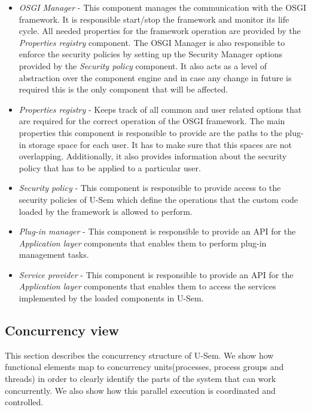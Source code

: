 \begin{itemize}

\item \textit{OSGI Manager} - This component manages the communication with the OSGI framework. It is responsible start/stop the framework and monitor its life cycle. All needed properties for the framework operation are provided by the \textit{Properties registry} component. The OSGI Manager is also responsible to enforce the security policies by setting up the Security Manager options provided by the \textit{Security policy} component. It also acts as a level of abstraction over the component engine and in case any change in future is required this is the only component that will be affected. 

\item \textit{Properties registry} - Keeps track of all common and user related options that are required for the correct operation of the OSGI framework. The main properties this component is responsible to provide are the paths to the plug-in storage space for each user. It has to make sure that this spaces are not overlapping. Additionally, it also provides information about the security policy that has to be applied to a particular user. 

\item \textit{Security policy} - This component is responsible to provide access to the security policies of U-Sem which define the operations that the custom code loaded by the framework is allowed to perform.

\item \textit{Plug-in manager} - This component is responsible to provide an API for the \textit{Application layer} components that enables them to perform plug-in management tasks.

\item \textit{Service provider} - This component is responsible to provide an API for the \textit{Application layer} components that enables them to access the services implemented by the loaded components in U-Sem.

\end{itemize}

\subsection{Concurrency view}

This section describes the concurrency structure of U-Sem. We show how functional elements map to concurrency units(processes, process groups and threads) in order to clearly identify the parts of the system that can work concurrently. We also show how this parallel execution is coordinated and controlled.

